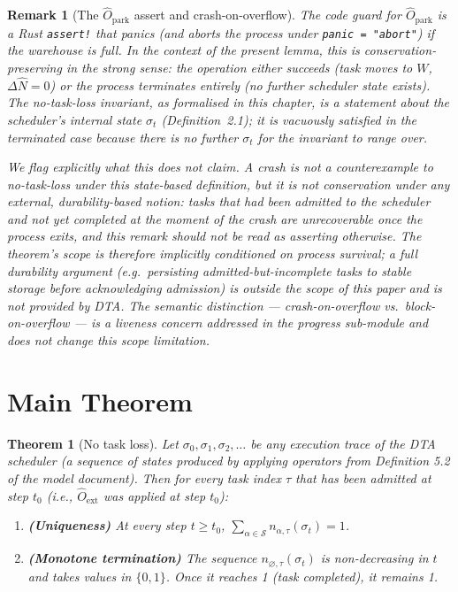 \documentclass[11pt,a4paper]{article}
\newtheorem{theorem}{Theorem}[section]
\newtheorem{remark}{Remark}[section]
\newcommand{\Num}{\hat{N}}
\newcommand{\code}[1]{\texttt{#1}}
\begin{document}
\begin{remark}[The $\hat{O}_{\text{park}}$ assert and crash-on-overflow]
\label{rem:crash-vacuous}
The code guard for $\hat{O}_{\text{park}}$ is a Rust \code{assert!}
that panics (and aborts the process under \code{panic = "abort"}) if
the warehouse is full.  In the context of the present lemma, this is
\emph{conservation-preserving in the strong sense}: the operation
either succeeds (task moves to $W$, $\Delta\Num = 0$) or the process
terminates entirely (no further scheduler state exists).  The
no-task-loss invariant, as formalised in this chapter, is a statement
about the \emph{scheduler's internal state} $\sigma_t$ (Definition~2.1);
it is vacuously satisfied in the terminated case because there is no
further $\sigma_t$ for the invariant to range over.

We flag explicitly what this does \emph{not} claim.  A crash is not a
counterexample to no-task-loss under this state-based definition, but it
is not conservation under any external, \emph{durability}-based notion:
tasks that had been admitted to the scheduler and not yet completed at
the moment of the crash are unrecoverable once the process exits, and
this remark should not be read as asserting otherwise. The theorem's
scope is therefore implicitly conditioned on \emph{process survival}; a
full durability argument (e.g.\ persisting admitted-but-incomplete tasks
to stable storage before acknowledging admission) is outside the scope
of this paper and is not provided by DTA.  The semantic distinction
--- crash-on-overflow vs.\ block-on-overflow --- is a \emph{liveness}
concern addressed in the progress sub-module and does not change this
scope limitation.
\end{remark}

\section{Main Theorem}

\begin{theorem}[No task loss]
\label{thm:ntl}
Let $\sigma_0, \sigma_1, \sigma_2, \ldots$ be any execution trace of
the DTA scheduler (a sequence of states produced by applying
operators from Definition 5.2 of the model document).  Then for every
task index $\tau$ that has been admitted at step $t_0$
(i.e., $\hat{O}_{\text{ext}}$ was applied at step $t_0$):

\begin{enumerate}
  \item \textbf{(Uniqueness)} At every step $t \geq t_0$,
        $\sum_{\alpha \in \mathcal{S}} n_{\alpha,\tau}(\sigma_t) = 1$.

  \item \textbf{(Monotone termination)} The sequence
        $n_{\varnothing,\tau}(\sigma_t)$ is non-decreasing in $t$
        and takes values in $\{0, 1\}$.  Once it reaches 1
        (task completed), it remains 1.
\end{enumerate}
\end{theorem}
\end{document}
